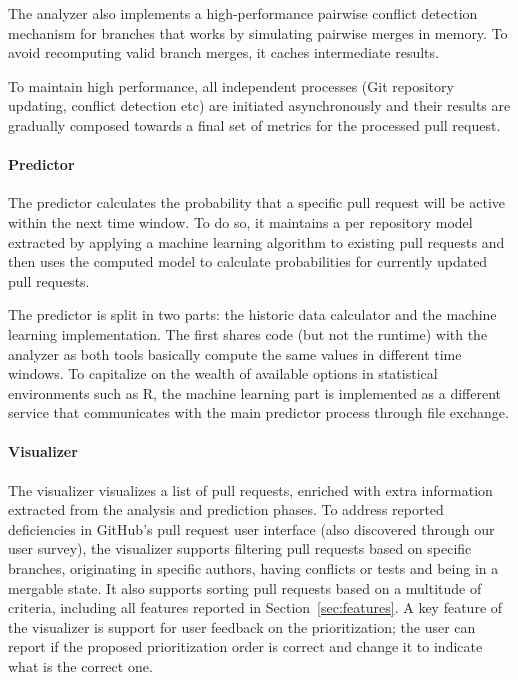 \documentclass[conference]{IEEEtran}
\begin{document}
The analyzer also implements a high-performance pairwise conflict detection
mechanism for branches that works by simulating pairwise merges in memory. To
avoid recomputing valid branch merges, it caches intermediate results.

To maintain high performance, all independent processes (Git repository
updating, conflict detection etc) are initiated asynchronously and their
results are gradually composed towards a final set of metrics for the processed
pull request.

\paragraph{Predictor}
The predictor calculates the probability that a specific pull request will
be active within the next time window. To do so, it maintains a per repository
model extracted by applying a machine learning algorithm to existing pull
requests and then uses the computed model to calculate probabilities for
currently updated pull requests.

The predictor is split in two parts: the historic data calculator and
the machine learning implementation. The first shares code (but not the
runtime) with the analyzer as both tools basically compute the same
values in different time windows. To capitalize on the wealth of available
options in statistical environments such as R, the machine learning
part is implemented as a different service that communicates with the
main predictor process through file exchange.

\paragraph{Visualizer}

The visualizer visualizes a list of pull requests, enriched with extra
information extracted from the analysis and prediction phases.  To address
reported deficiencies in GitHub's pull request user interface (also discovered
through our user survey), the visualizer supports filtering pull requests based
on specific branches, originating in specific authors, having conflicts or tests
and being in a mergable state.  It also supports sorting pull requests based on
a multitude of criteria, including all features reported in
Section~\ref{sec:features}.  A key feature of the visualizer is support for user
feedback on the prioritization; the user can report if the proposed
prioritization order is correct and change it to indicate what is the correct
one.
\end{document}

